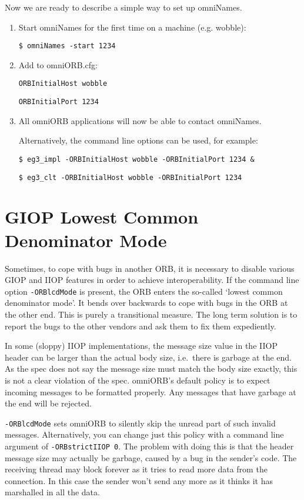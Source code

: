 \documentclass[11pt,twoside,a4paper]{book}
\newcommand{\cmdline}[1]{\texttt{#1}}
\begin{document}
Now we are ready to describe a simple way to set up omniNames.

\begin{enumerate}
\item Start omniNames for the first time on a machine (e.g. wobble):

{\tt \$ omniNames -start 1234}

\item Add to omniORB.cfg:

{\tt ORBInitialHost wobble}

{\tt ORBInitialPort 1234}

\item All omniORB applications will now be able to contact omniNames.

Alternatively, the command line options can be used, for example:

{\tt \$ eg3\_impl -ORBInitialHost wobble -ORBInitialPort 1234 \&}

{\tt \$ eg3\_clt -ORBInitialHost wobble -ORBInitialPort 1234}

\end{enumerate}




\section{GIOP Lowest Common Denominator Mode}
\label{sec:lcd}
\label{sec:strictIIOP}

Sometimes, to cope with bugs in another ORB, it is necessary to
disable various GIOP and IIOP features in order to achieve
interoperability. If the command line option \cmdline{-ORBlcdMode} is
present, the ORB enters the so-called `lowest common denominator
mode'. It bends over backwards to cope with bugs in the ORB at the
other end. This is purely a transitional measure. The long term
solution is to report the bugs to the other vendors and ask them to
fix them expediently.

In some (sloppy) IIOP implementations, the message size value in the
IIOP header can be larger than the actual body size, i.e.\ there is
garbage at the end. As the spec does not say the message size must
match the body size exactly, this is not a clear violation of the
spec. omniORB's default policy is to expect incoming messages to be
formatted properly. Any messages that have garbage at the end will be
rejected.

\cmdline{-ORBlcdMode} sets omniORB to silently skip the unread part of
such invalid messages. Alternatively, you can change just this policy
with a command line argument of \cmdline{-ORBstrictIIOP 0}. The
problem with doing this is that the header message size may actually
be garbage, caused by a bug in the sender's code. The receiving thread
may block forever as it tries to read more data from the
connection. In this case the sender won't send any more as it thinks
it has marshalled in all the data.
\end{document}

